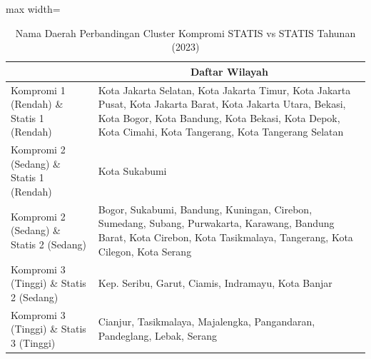 \begin{table}[H]
\centering
\caption{Nama Daerah Perbandingan Cluster Kompromi STATIS vs STATIS Tahunan (2023)} \label{tab:app2comp_statis_name_2023}
\begin{adjustbox}{max width=\textwidth}
\begin{tabular}{|>{\centering\arraybackslash}p{4cm}|p{10cm}|}
\hline
\multicolumn{1}{|c|}{\textbf{Kategori}} & \multicolumn{1}{c|}{\textbf{Daftar Wilayah}} \\
\hline
Kompromi 1 (Rendah) \& Statis 1 (Rendah) & Kota Jakarta Selatan, Kota Jakarta Timur, Kota Jakarta Pusat, Kota Jakarta Barat, Kota Jakarta Utara, Bekasi, Kota Bogor, Kota Bandung, Kota Bekasi, Kota Depok, Kota Cimahi, Kota Tangerang, Kota Tangerang Selatan \\
\hline
Kompromi 2 (Sedang) \& Statis 1 (Rendah) & Kota Sukabumi \\
\hline
Kompromi 2 (Sedang) \& Statis 2 (Sedang) & Bogor, Sukabumi, Bandung, Kuningan, Cirebon, Sumedang, Subang, Purwakarta, Karawang, Bandung Barat, Kota Cirebon, Kota Tasikmalaya, Tangerang, Kota Cilegon, Kota Serang \\
\hline
Kompromi 3 (Tinggi) \& Statis 2 (Sedang) & Kep. Seribu, Garut, Ciamis, Indramayu, Kota Banjar \\
\hline
Kompromi 3 (Tinggi) \& Statis 3 (Tinggi) & Cianjur, Tasikmalaya, Majalengka, Pangandaran, Pandeglang, Lebak, Serang \\
\hline
\end{tabular}
\end{adjustbox}
\end{table}